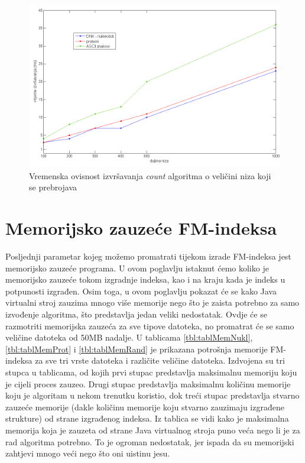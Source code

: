 \begin{figure}[H]
   \centering
       \includegraphics[width=\textwidth]{./pictures/test_count.png}
 \caption{Vremenska ovisnost izvršavanja \emph{count} algoritma o veličini niza koji se prebrojava}
 \label{fig:test_count}
\end{figure}


\section{Memorijsko zauzeće FM-indeksa}

Posljednji parametar kojeg možemo promatrati tijekom izrade FM-indeksa jest memorijsko zauzeće programa. U ovom poglavlju istaknut ćemo koliko je memorijsko zauzeće tokom izgradnje indeksa, kao i na kraju kada je indeks u potpunosti izgrađen. Osim toga, u ovom poglavlju pokazat će se kako Java virtualni stroj zauzima mnogo više memorije nego što je zaista potrebno za samo izvođenje algoritma, što predstavlja jedan veliki nedostatak. Ovdje će se razmotriti memorijska zauzeća za sve tipove datoteka, no promatrat će se samo veličine datoteka od 50MB nadalje. U tablicama \ref{tbl:tablMemNukl}, \ref{tbl:tablMemProt} i \ref{tbl:tablMemRand} je prikazana potrošnja memorije FM-indeksa za sve tri vrste datoteka i različite veličine datoteka. Izdvojena su tri stupca u tablicama, od kojih prvi stupac predstavlja maksimalnu memoriju koju je cijeli proces zauzeo. Drugi stupac predstavlja maksimalnu količinu memorije koju je algoritam u nekom trenutku koristio, dok treći stupac predstavlja stvarno zauzeće memorije (dakle količinu memorije koju stvarno zauzimaju izgrađene strukture) od strane izgrađenog indeksa. Iz tablica se vidi kako je maksimalna memorija koja je zauzeta od strane Java virtualnog stroja puno veća nego li je za rad algoritma potrebno. To je ogroman nedostatak, jer ispada da su memorijski zahtjevi mnogo veći nego što oni uistinu jesu.


